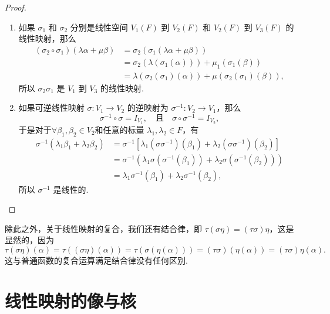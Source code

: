 \begin{proof}
\begin{enumerate}
    \item 如果 $\sigma_1$ 和 $\sigma_2$ 分别是线性空间 $V_1(F)$ 到 $V_2(F)$ 和 $V_2(F)$ 到 $V_3(F)$ 的线性映射，那么
    \begin{align*}
        (\sigma_2 \circ \sigma_1)(\lambda \alpha  + \mu \beta) & = \sigma_2(\sigma_1(\lambda \alpha  + \mu \beta)) \\
        & = \sigma_2(\lambda (\sigma_1(\alpha))) + \mu_1(\sigma_1(\beta)) \\
        & = \lambda (\sigma_2(\sigma_1)(\alpha)) + \mu (\sigma_2(\sigma_1)(\beta)),
    \end{align*}
    所以 $\sigma_2\sigma_1$ 是 $V_1$ 到 $V_3$ 的线性映射.

    \item 如果可逆线性映射 $\sigma: V_1 \to V_2$ 的逆映射为 $\sigma^{-1}: V_2 \to V_1$，那么
    \[
    \sigma^{-1} \circ \sigma = I_{V_1}, \quad \text{且} \quad \sigma \circ \sigma^{-1} = I_{V_2},
    \]
    于是对于$ \forall \beta_1,\beta_2 \in V_2$和任意的标量 $\lambda_1, \lambda_2 \in F$，有
    \begin{align*}
        \sigma^{-1}(\lambda_1 \beta_1 + \lambda_2 \beta_2) & = \sigma^{-1}\left[ \lambda_1(\sigma \sigma^{-1})(\beta_1)+\lambda_2(\sigma \sigma^{-1})(\beta_2)\right] \\
        &= \sigma^{-1}(\lambda_1 \sigma(\sigma^{-1}(\beta_1)) + \lambda_2 \sigma(\sigma^{-1}(\beta_2))) \\
        & = \lambda_1 \sigma^{-1}(\beta_1) + \lambda_2 \sigma^{-1}(\beta_2),
    \end{align*}
    所以 $\sigma^{-1}$ 是线性的.
\end{enumerate}
\end{proof}

除此之外，关于线性映射的复合，我们还有结合律，即 $\tau(\sigma\eta) = (\tau\sigma)\eta$，这是显然的，因为
\[\tau(\sigma\eta)(\alpha) = \tau((\sigma\eta)(\alpha)) = \tau(\sigma(\eta(\alpha))) = (\tau\sigma)(\eta(\alpha)) = (\tau\sigma)\eta(\alpha).\]
这与普通函数的复合运算满足结合律没有任何区别.

\section{线性映射的像与核}

